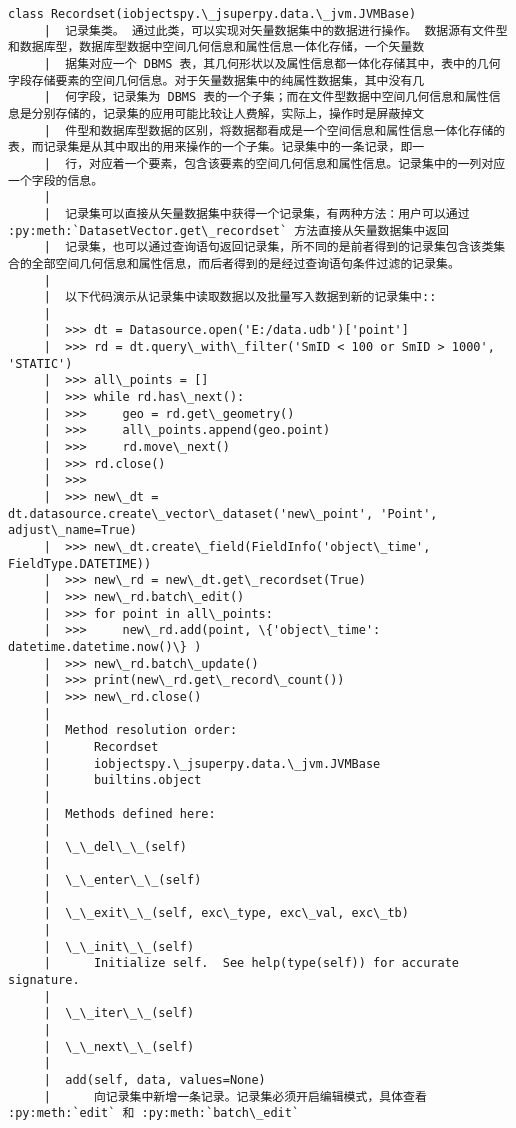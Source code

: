 \documentclass[11pt]{article}
\begin{document}
\begin{Verbatim}[commandchars=\\\{\}]
    class Recordset(iobjectspy.\_jsuperpy.data.\_jvm.JVMBase)
     |  记录集类。 通过此类，可以实现对矢量数据集中的数据进行操作。 数据源有文件型和数据库型，数据库型数据中空间几何信息和属性信息一体化存储，一个矢量数
     |  据集对应一个 DBMS 表，其几何形状以及属性信息都一体化存储其中，表中的几何字段存储要素的空间几何信息。对于矢量数据集中的纯属性数据集，其中没有几
     |  何字段，记录集为 DBMS 表的一个子集；而在文件型数据中空间几何信息和属性信息是分别存储的，记录集的应用可能比较让人费解，实际上，操作时是屏蔽掉文
     |  件型和数据库型数据的区别，将数据都看成是一个空间信息和属性信息一体化存储的表，而记录集是从其中取出的用来操作的一个子集。记录集中的一条记录，即一
     |  行，对应着一个要素，包含该要素的空间几何信息和属性信息。记录集中的一列对应一个字段的信息。
     |  
     |  记录集可以直接从矢量数据集中获得一个记录集，有两种方法：用户可以通过 :py:meth:`DatasetVector.get\_recordset` 方法直接从矢量数据集中返回
     |  记录集，也可以通过查询语句返回记录集，所不同的是前者得到的记录集包含该类集合的全部空间几何信息和属性信息，而后者得到的是经过查询语句条件过滤的记录集。
     |  
     |  以下代码演示从记录集中读取数据以及批量写入数据到新的记录集中::
     |  
     |  >>> dt = Datasource.open('E:/data.udb')['point']
     |  >>> rd = dt.query\_with\_filter('SmID < 100 or SmID > 1000', 'STATIC')
     |  >>> all\_points = []
     |  >>> while rd.has\_next():
     |  >>>     geo = rd.get\_geometry()
     |  >>>     all\_points.append(geo.point)
     |  >>>     rd.move\_next()
     |  >>> rd.close()
     |  >>>
     |  >>> new\_dt = dt.datasource.create\_vector\_dataset('new\_point', 'Point', adjust\_name=True)
     |  >>> new\_dt.create\_field(FieldInfo('object\_time', FieldType.DATETIME))
     |  >>> new\_rd = new\_dt.get\_recordset(True)
     |  >>> new\_rd.batch\_edit()
     |  >>> for point in all\_points:
     |  >>>     new\_rd.add(point, \{'object\_time': datetime.datetime.now()\} )
     |  >>> new\_rd.batch\_update()
     |  >>> print(new\_rd.get\_record\_count())
     |  >>> new\_rd.close()
     |  
     |  Method resolution order:
     |      Recordset
     |      iobjectspy.\_jsuperpy.data.\_jvm.JVMBase
     |      builtins.object
     |  
     |  Methods defined here:
     |  
     |  \_\_del\_\_(self)
     |  
     |  \_\_enter\_\_(self)
     |  
     |  \_\_exit\_\_(self, exc\_type, exc\_val, exc\_tb)
     |  
     |  \_\_init\_\_(self)
     |      Initialize self.  See help(type(self)) for accurate signature.
     |  
     |  \_\_iter\_\_(self)
     |  
     |  \_\_next\_\_(self)
     |  
     |  add(self, data, values=None)
     |      向记录集中新增一条记录。记录集必须开启编辑模式，具体查看 :py:meth:`edit` 和 :py:meth:`batch\_edit`

\end{Verbatim}
\end{document}
